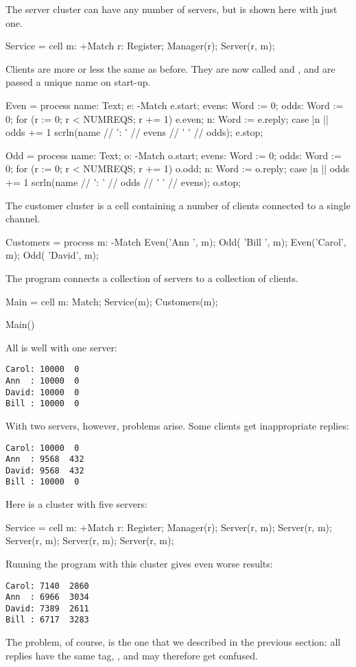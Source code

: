 The server cluster can have any number of servers, but is shown here with just one.
\begin{code}
Service = cell m: +Match
{
  r: Register;
  Manager(r);
  Server(r, m);
}
\end{code}

Clients are more or less the same as before.  They are now called  and , and are passed a unique name on start-up.
\begin{code}
Even = process name: Text; e: -Match
{
  e.start;
  evens: Word := 0;
  odds: Word := 0;
  for (r := 0; r < NUMREQS; r += 1)
  {
    e.even;
    n: Word := e.reply;
    case
    {
      |n %
      || odds += 1
    }
  }
  scrln(name // ': ' // evens // '  ' // odds);
  e.stop;
}
\end{code}

\begin{code}
Odd = process name: Text; o: -Match
{
  o.start;
  evens: Word := 0;
  odds: Word := 0;
  for (r := 0; r < NUMREQS; r += 1)
  {
    o.odd;
    n: Word := o.reply;
    case
    {
      |n %
      || odds += 1
    }
  }
  scrln(name // ': ' // odds // '  ' // evens);
  o.stop;
}
\end{code}

The customer cluster is a cell containing a number of clients connected to a single channel. 
\begin{code}
Customers = process m: -Match
{
   Even('Ann  ', m);
   Odd( 'Bill ', m);
   Even('Carol', m);
   Odd( 'David', m);
}
\end{code}

The program connects a collection of servers to a collection of clients.
\begin{code}
Main = cell
{
  m: Match;
  Service(m);
  Customers(m);
}

Main()
\end{code}

All is well with one server:
\begin{verbatim}
Carol: 10000  0
Ann  : 10000  0
David: 10000  0
Bill : 10000  0
\end{verbatim}

With two servers, however, problems arise.  Some clients get inappropriate replies:
\begin{verbatim}
Carol: 10000  0
Ann  : 9568  432
David: 9568  432
Bill : 10000  0
\end{verbatim}

Here is a cluster with five servers:
\begin{dummy}
Service = cell m: +Match
{
  r: Register;
  Manager(r);
  Server(r, m);
  Server(r, m);
  Server(r, m);
  Server(r, m);
  Server(r, m);
}
\end{dummy}

Running the program with this cluster gives even worse results:
\begin{verbatim}
Carol: 7140  2860
Ann  : 6966  3034
David: 7389  2611
Bill : 6717  3283
\end{verbatim}

The problem, of course, is the one that we described in the previous section: all replies have the same tag, , and may therefore get confused.

